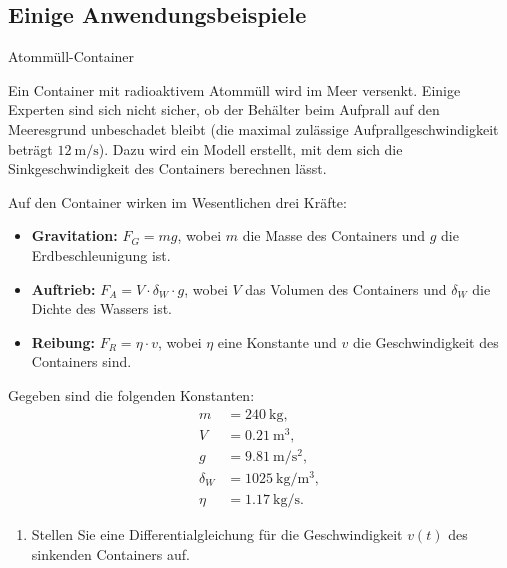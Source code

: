 \clearpage

\subsection{Einige Anwendungsbeispiele}

\begin{bsp}{Atommüll-Container}{}

    Ein Container mit radioaktivem Atommüll wird im Meer versenkt.
    Einige Experten sind sich nicht sicher, ob der Behälter beim
    Aufprall auf den Meeresgrund unbeschadet bleibt (die maximal
    zulässige Aufprallgeschwindigkeit beträgt
    \(\SI{12}{\meter\per\second}\)).
    Dazu wird ein Modell erstellt, mit dem sich die
    Sinkgeschwindigkeit des Containers berechnen lässt.

    Auf den Container wirken im Wesentlichen drei Kräfte:

    \begin{itemize}
        \item \textbf{Gravitation:}
              \(F_G=mg\), wobei \(m\) die Masse des Containers
              und \(g\) die Erdbeschleunigung ist.

        \item \textbf{Auftrieb:}
              \(F_A=V\cdot\delta_W\cdot g\), wobei \(V\) das
              Volumen des Containers und \(\delta_W\) die
              Dichte des Wassers ist.

        \item \textbf{Reibung:}
              \(F_R=\eta\cdot v\), wobei \(\eta\) eine
              Konstante und \(v\) die Geschwindigkeit
              des Containers sind.
    \end{itemize}

    Gegeben sind die folgenden Konstanten:
    \[
        \begin{aligned}
            m        & = \SI{240}{\kilogram},                  \\
            V        & = \SI{0.21}{\cubic\meter},              \\
            g        & = \SI{9.81}{\meter\per\second\squared}, \\
            \delta_W & = \SI{1025}{\kilogram\per\cubic\meter}, \\
            \eta     & = \SI{1.17}{\kilogram\per\second}.
        \end{aligned}
    \]

    \begin{enumerate}
        \item Stellen Sie eine Differentialgleichung für die
              Geschwindigkeit \(v(t)\) des sinkenden Containers auf.


\end{enumerate}
\end{bsp}
